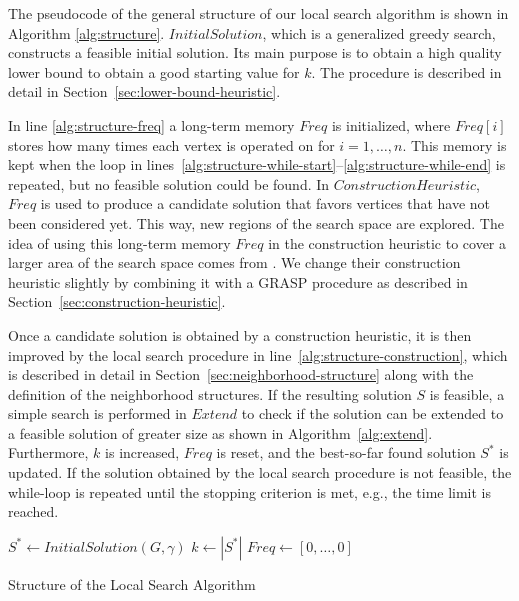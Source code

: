 \documentclass[draft,final]{vutinfth} %
\begin{document}
The pseudocode of the general structure of our local search algorithm is shown in Algorithm \ref{alg:structure}.
$\mathit{InitialSolution}$, which is a generalized greedy search, constructs a feasible initial solution. Its main purpose is to obtain a high quality lower bound to obtain a good starting value for $k$. The procedure is described in detail in Section~\ref{sec:lower-bound-heuristic}.

In line \ref{alg:structure-freq} a long-term memory $\mathit{Freq}$ is initialized, where $\mathit{Freq[i]}$ stores how many times each vertex is operated on for $i=1,\dots,n$. This memory is kept when the loop in lines~\ref{alg:structure-while-start}--\ref{alg:structure-while-end} is repeated, but no feasible solution could be found. In $\mathit{ConstructionHeuristic}$, $\mathit{Freq}$ is used to produce a candidate solution that favors vertices that have not been considered yet. This way, new regions of the search space are explored. The idea of using this long-term memory $\mathit{Freq}$ in the construction heuristic to cover a larger area of the search space comes from \cite{chen_nuqclq_2021}. We change their construction heuristic slightly by combining it with a GRASP procedure as described in Section~\ref{sec:construction-heuristic}. 

Once a candidate solution is obtained by a construction heuristic, it is then improved by the local search procedure in line~\ref{alg:structure-construction}, which is described in detail in Section~\ref{sec:neighborhood-structure} along with the definition of the neighborhood structures. If the resulting solution $S$ is feasible, a simple search is performed in $\mathit{Extend}$ to check if the solution can be extended to a feasible solution of greater size as shown in Algorithm~\ref{alg:extend}.
Furthermore, $k$ is increased, $\mathit{Freq}$ is reset, and the best-so-far found solution $S^*$ is updated. 
If the solution obtained by the local search procedure is not feasible, the while-loop is repeated until the stopping criterion is met, e.g., the time limit is reached. 

\begin{algorithm}
    \DontPrintSemicolon
    $S^* \gets \mathit{InitialSolution}(G, \gamma)$ \;
    $k \gets |S^*|$ \; \label{alg:structure-lower-bound}
    $\mathit{Freq} \gets [0, \dots, 0]$ \label{alg:structure-freq}  

    \caption{Structure of the Local Search Algorithm}
    \label{alg:structure}
\end{algorithm}
\end{document}

